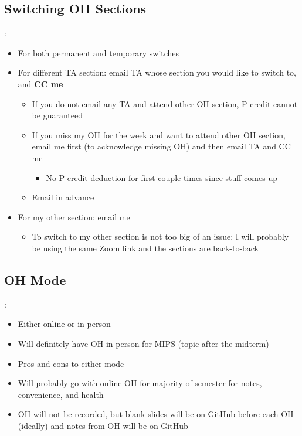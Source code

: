 \documentclass{../slides}
\begin{document}
\subsection{Switching OH Sections}
\begin{frame}{\secname: \subsecname}
    \begin{itemize}
        \item For both permanent and temporary switches
        \item For different TA section: email TA whose section you would like to switch to, and \textbf{CC me}
        \begin{itemize}
            \item If you do not email any TA and attend other OH section, P-credit cannot be guaranteed
            \item If you miss my OH for the week and want to attend other OH section, email me first (to acknowledge missing OH) and then email TA and CC me
            \begin{itemize}
                \item No P-credit deduction for first couple times since stuff comes up
            \end{itemize}
            \item Email in advance
        \end{itemize}
        \item For my other section: email me
        \begin{itemize}
            \item To switch to my other section is not too big of an issue; I will probably be using the same Zoom link and the sections are back-to-back
        \end{itemize}
    \end{itemize}
\end{frame}

\subsection{OH Mode}
\begin{frame}{\secname: \subsecname}
    \begin{itemize}
        \item Either online or in-person
        \item Will definitely have OH in-person for MIPS (topic after the midterm)
        \item Pros and cons to either mode
        \item Will probably go with online OH for majority of semester for notes, convenience, and health
        \item OH will not be recorded, but blank slides will be on GitHub before each OH (ideally) and notes from OH will be on GitHub
    \end{itemize}
\end{frame}
\end{document}
